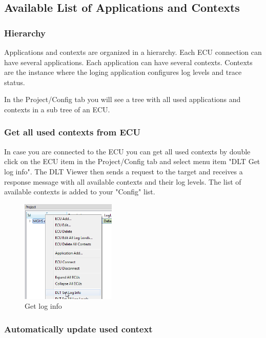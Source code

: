 \documentclass[a4paper,11pt]{article}
\begin{document}
\pagebreak

\subsection{Available List of Applications and Contexts}


\subsubsection{Hierarchy}

Applications and contexts are organized in a hierarchy. Each ECU connection can have
several applications. Each application can have several contexts. Contexts are the instance
where the loging application configures log levels and trace status.

In the Project/Config tab you will see a tree with all used applications and contexts in a sub
tree of an ECU.

\subsubsection{Get all used contexts from ECU}

\label{getallcontexts}
In case you are connected to the ECU you can get all used contexts by double click on the
ECU item in the Project/Config tab and select menu item "DLT Get log info".
The DLT Viewer then sends a request to the target and receives a response message
with all available contexts and their log levels. The list of available contexts is added
to your "Config" list.

\begin{figure}[H]
 \centering
  \includegraphics[width=0.4\textwidth]{images/getloginfo.png}
 \caption{Get log info}
 \label{fig:getloginfo}
\end{figure}


\subsubsection{Automatically update used context}
\end{document}
